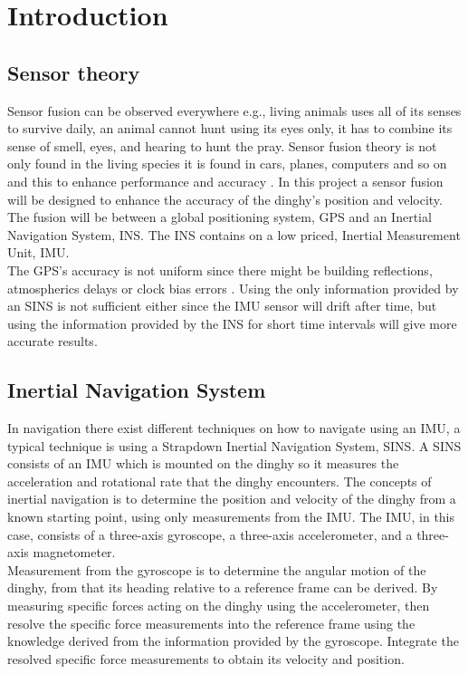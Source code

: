 
\section{Introduction}
\subsection*{Sensor theory}
Sensor fusion can be observed everywhere e.g., living animals uses all of its senses to survive daily, an animal cannot hunt using its eyes only, it has to combine its sense of smell, eyes, and hearing to hunt the pray\cite{animal}. Sensor fusion theory is not only found in the living species it is found in cars, planes, computers and so on and this to enhance performance and accuracy \cite{animal}. In this project a sensor fusion will be designed to enhance the accuracy of the dinghy's position and velocity. The fusion will be between a global positioning system, GPS and an Inertial Navigation System, INS. The INS contains on a low priced, Inertial Measurement Unit, IMU.\\ 
The GPS's accuracy is not uniform since there might be building reflections, atmospherics delays or clock bias errors \cite{boken}. Using the only information provided by an SINS is not sufficient either since the IMU sensor will drift after time, but using the information provided by the INS for short time intervals will give more accurate results.  

\subsection{Inertial Navigation System}
In navigation there exist different techniques on how to navigate using an IMU, a typical technique is using a Strapdown Inertial Navigation System, SINS. A SINS consists of an IMU which is mounted on the dinghy so it measures the acceleration and rotational rate that the dinghy encounters.
The concepts of inertial navigation is to determine the position and velocity of the dinghy from a known starting point, using only measurements from the IMU. The IMU, in this case, consists of a three-axis gyroscope, a three-axis accelerometer, and a three-axis magnetometer. \\
Measurement from the gyroscope is to determine the angular motion of the dinghy, from that its heading relative to a reference frame can be derived.
By measuring specific forces acting on the dinghy using the accelerometer, then resolve the specific force measurements into the reference frame using the knowledge derived from the information provided by the gyroscope. 
Integrate the resolved specific force measurements to obtain its velocity and position. \cite{non-linear} 


